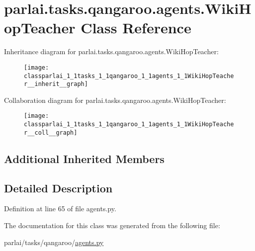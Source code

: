 \hypertarget{classparlai_1_1tasks_1_1qangaroo_1_1agents_1_1WikiHopTeacher}{}\section{parlai.\+tasks.\+qangaroo.\+agents.\+Wiki\+Hop\+Teacher Class Reference}
\label{classparlai_1_1tasks_1_1qangaroo_1_1agents_1_1WikiHopTeacher}


Inheritance diagram for parlai.\+tasks.\+qangaroo.\+agents.\+Wiki\+Hop\+Teacher\+:
\nopagebreak
\begin{figure}[H]
\begin{center}
\leavevmode
\texttt{[image: classparlai\_1\_1tasks\_1\_1qangaroo\_1\_1agents\_1\_1WikiHopTeacher\_\_inherit\_\_graph]}
\end{center}
\end{figure}


Collaboration diagram for parlai.\+tasks.\+qangaroo.\+agents.\+Wiki\+Hop\+Teacher\+:
\nopagebreak
\begin{figure}[H]
\begin{center}
\leavevmode
\texttt{[image: classparlai\_1\_1tasks\_1\_1qangaroo\_1\_1agents\_1\_1WikiHopTeacher\_\_coll\_\_graph]}
\end{center}
\end{figure}
\subsection*{Additional Inherited Members}


\subsection{Detailed Description}


Definition at line 65 of file agents.\+py.



The documentation for this class was generated from the following file\+:\begin{DoxyCompactItemize}
\item 
parlai/tasks/qangaroo/\hyperlink{parlai_2tasks_2qangaroo_2agents_8py}{agents.\+py}\end{DoxyCompactItemize}
